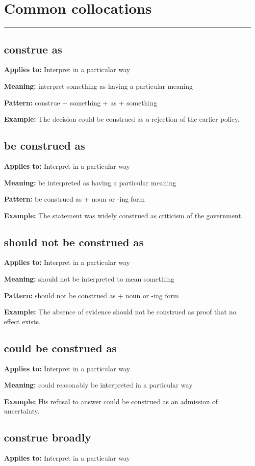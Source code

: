 \documentclass[11pt]{article}
\newcommand{\sectionrule}{\par\vspace{-0.5em}\noindent\textcolor{Accent}{\rule{\linewidth}{0.6pt}}\par}
\begin{document}
\section{Common collocations}
\sectionrule
\subsection{construe as}
\textbf{Applies to:} Interpret in a particular way

\textbf{Meaning:} interpret something as having a particular meaning

\textbf{Pattern:} construe + something + as + something

\textbf{Example:} The decision could be construed as a rejection of the earlier policy.

\subsection{be construed as}
\textbf{Applies to:} Interpret in a particular way

\textbf{Meaning:} be interpreted as having a particular meaning

\textbf{Pattern:} be construed as + noun or -ing form

\textbf{Example:} The statement was widely construed as criticism of the government.

\subsection{should not be construed as}
\textbf{Applies to:} Interpret in a particular way

\textbf{Meaning:} should not be interpreted to mean something

\textbf{Pattern:} should not be construed as + noun or -ing form

\textbf{Example:} The absence of evidence should not be construed as proof that no effect exists.

\subsection{could be construed as}
\textbf{Applies to:} Interpret in a particular way

\textbf{Meaning:} could reasonably be interpreted in a particular way

\textbf{Example:} His refusal to answer could be construed as an admission of uncertainty.

\subsection{construe broadly}
\textbf{Applies to:} Interpret in a particular way
\end{document}
